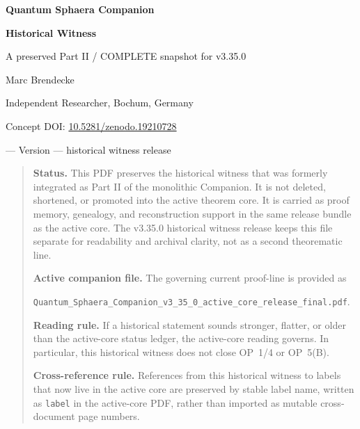 \begin{center}
{\LARGE\bfseries Quantum Sphaera Companion}\par\vspace{0.4em}
{\Large\bfseries Historical Witness}\par\vspace{0.8em}
{\large A preserved Part II / COMPLETE snapshot for v3.35.0}\par\vspace{0.8em}
Marc Brendecke\par
Independent Researcher, Bochum, Germany\par
Concept DOI: \href{https://doi.org/10.5281/zenodo.19210728}{10.5281/zenodo.19210728}\par
\docdate{} --- Version \docversion{} --- historical witness release
\end{center}
\thispagestyle{fancy}

\begin{quote}\small
\noindent\textbf{Status.} This PDF preserves the historical witness that was formerly integrated as Part II of the monolithic Companion. It is not deleted, shortened, or promoted into the active theorem core. It is carried as proof memory, genealogy, and reconstruction support in the same release bundle as the active core. The v3.35.0 historical witness release keeps this file separate for readability and archival clarity, not as a second theorematic line.

\medskip
\noindent\textbf{Active companion file.} The governing current proof-line is provided as\par
\texttt{Quantum\_Sphaera\_Companion\_v3\_35\_0\_active\_core\_release\_final.pdf}.

\medskip
\noindent\textbf{Reading rule.} If a historical statement sounds stronger, flatter, or older than the active-core status ledger, the active-core reading governs. In particular, this historical witness does not close OP~1/4 or OP~5(B).

\medskip
\noindent\textbf{Cross-reference rule.} References from this historical witness to labels that now live in the active core are preserved by stable label name, written as \texttt{label} in the active-core PDF, rather than imported as mutable cross-document page numbers.
\end{quote}

\clearpage
\tableofcontents
\clearpage
